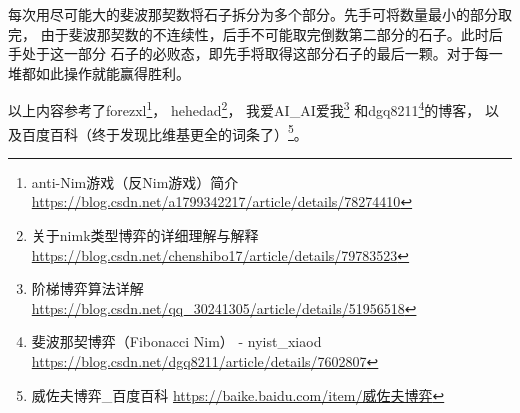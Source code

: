 每次用尽可能大的斐波那契数将石子拆分为多个部分。先手可将数量最小的部分取完，
由于斐波那契数的不连续性，后手不可能取完倒数第二部分的石子。此时后手处于这一部分
石子的必败态，即先手将取得这部分石子的最后一颗。对于每一堆都如此操作就能赢得胜利。

以上内容参考了forezxl\footnote{anti-Nim游戏（反Nim游戏）简介
	\url{https://blog.csdn.net/a1799342217/article/details/78274410}}，
hehedad\footnote{关于nimk类型博弈的详细理解与解释
	\url{https://blog.csdn.net/chenshibo17/article/details/79783523}}，
我爱AI\_AI爱我\footnote{阶梯博弈算法详解
	\url{https://blog.csdn.net/qq\_30241305/article/details/51956518}}
和dgq8211\footnote{
	斐波那契博弈（Fibonacci Nim） - nyist\_xiaod
	\url{https://blog.csdn.net/dgq8211/article/details/7602807}
}的博客，
以及百度百科（终于发现比维基更全的词条了）\footnote{
	威佐夫博弈\_百度百科
	\url{https://baike.baidu.com/item/威佐夫博弈}
}。
